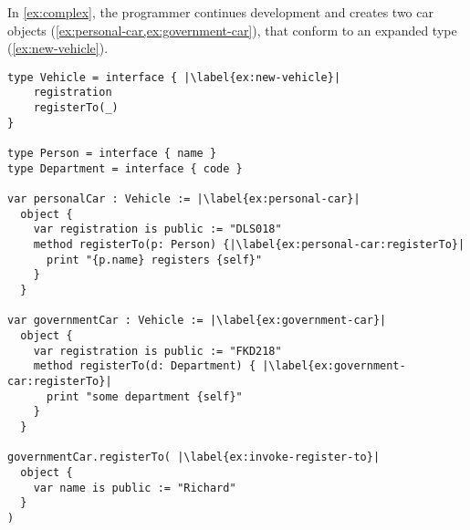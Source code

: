 



In \cref{ex:complex}, 
the programmer continues development and creates two car objects 
(\cref{ex:personal-car,ex:government-car}),
that conform to an expanded  type (\cref{ex:new-vehicle}).



\begin{lstlisting}[caption={A program in development with inconsistent
    types.},escapechar=|,label={ex:complex},float,floatplacement=htb,columns=flexible,float,floatplacement=H]
type Vehicle = interface { |\label{ex:new-vehicle}|
    registration
    registerTo(_)
}

type Person = interface { name }
type Department = interface { code }

var personalCar : Vehicle := |\label{ex:personal-car}|
  object {
    var registration is public := "DLS018"
    method registerTo(p: Person) {|\label{ex:personal-car:registerTo}|
      print "{p.name} registers {self}"
    } 
  }

var governmentCar : Vehicle := |\label{ex:government-car}|
  object {
    var registration is public := "FKD218"
    method registerTo(d: Department) { |\label{ex:government-car:registerTo}|
      print "some department {self}"
    }
  }

governmentCar.registerTo( |\label{ex:invoke-register-to}|
  object {
    var name is public := "Richard"
  }
)
\end{lstlisting}


